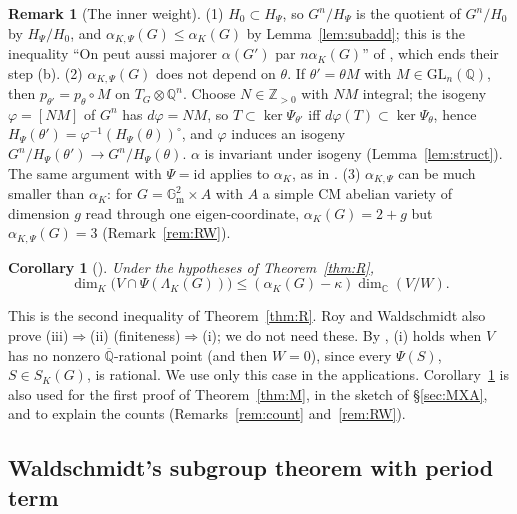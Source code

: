 \documentclass[11pt]{amsart}
\newtheorem{corollary}[theorem]{Corollary}
\theoremstyle{definition}
\newtheorem{remark}[theorem]{Remark}
\newcommand{\Qb}{\overline{\mathbb{Q}}}
\newcommand{\C}{\mathbb{C}}
\newcommand{\Q}{\mathbb{Q}}
\newcommand{\Z}{\mathbb{Z}}
\newcommand{\Gm}{\mathbb{G}_{\mathrm m}}
\begin{document}
\begin{remark}[The inner weight]\label{rem:inner}
(1) $H_0\subset H_\Psi$, so $G^n/H_\Psi$ is the quotient of $G^n/H_0$ by $H_\Psi/H_0$, and $\alpha_{K,\Psi}(G)\le\alpha_K(G)$
by Lemma~\ref{lem:subadd}; this is the inequality ``On peut aussi majorer $\alpha(G')$ par $n\alpha_K(G)$'' of
\cite[p.~364]{RW93}, which ends their step (b).
(2) $\alpha_{K,\Psi}(G)$ does not depend on $\theta$. If $\theta'=\theta M$ with $M\in\mathrm{GL}_n(\Q)$, then
$p_{\theta'}=p_\theta\circ M$ on $T_G\otimes\Q^n$. Choose $N\in\Z_{>0}$ with $NM$ integral; the isogeny $\varphi=[NM]$ of
$G^n$ has $d\varphi=NM$, so $T\subset\ker\Psi_{\theta'}$ iff $d\varphi(T)\subset\ker\Psi_\theta$, hence
$H_\Psi(\theta')=\varphi^{-1}(H_\Psi(\theta))^\circ$, and $\varphi$ induces an isogeny
$G^n/H_\Psi(\theta')\to G^n/H_\Psi(\theta)$. $\alpha$ is invariant under isogeny (Lemma~\ref{lem:struct}). The same argument
with $\Psi=\mathrm{id}$ applies to $\alpha_K$, as in \cite[p.~360]{RW93}.
(3) $\alpha_{K,\Psi}$ can be much smaller than $\alpha_K$: for $G=\Gm^2\times A$ with $A$ a simple CM abelian variety of
dimension $g$ read through one eigen-coordinate, $\alpha_K(G)=2+g$ but $\alpha_{K,\Psi}(G)=3$ (Remark~\ref{rem:RW}).
\end{remark}

\begin{corollary}[{\cite[Th\'eor\`eme, (i)$\Rightarrow$(iii), p.~363]{RW93}}]\label{thm:RW}
Under the hypotheses of Theorem~\ref{thm:R},
\[
\dim_K\bigl(V\cap\Psi(\Lambda_K(G))\bigr)\le(\alpha_K(G)-\kappa)\dim_\C(V/W).
\]
\end{corollary}

\noindent This is the second inequality of Theorem~\ref{thm:R}. Roy and Waldschmidt also prove (iii)$\Rightarrow$(ii)
(finiteness)$\Rightarrow$(i); we do not need these. By \cite[Remarque 1]{RW93}, (i) holds when $V$ has no nonzero
$\Qb$-rational point (and then $W=0$), since every $\Psi(S)$, $S\in S_K(G)$, is rational. We use only this case in the
applications. Corollary~\ref{thm:RW} is also used for the first proof of Theorem~\ref{thm:M}, in the sketch of
\S\ref{sec:MXA}, and to explain the counts (Remarks~\ref{rem:count} and~\ref{rem:RW}).

\subsection{Waldschmidt's subgroup theorem with period term}\label{sec:W88}
\end{document}
